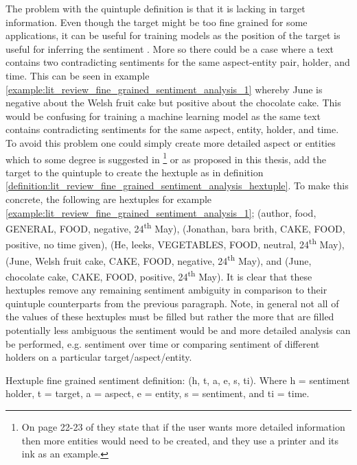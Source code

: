 The problem with the quintuple definition is that it is lacking in target information. Even though the target might be too fine grained for some applications, it can be useful for training models as the position of the target is useful for inferring the sentiment \citep{gu-etal-2018-position}. More so there could be a case where a text contains two contradicting sentiments for the same aspect-entity pair, holder, and time. This can be seen in example \ref{example:lit_review_fine_grained_sentiment_analysis_1} whereby June is negative about the Welsh fruit cake but positive about the chocolate cake. This would be confusing for training a machine learning model as the same text contains contradicting sentiments for the same aspect, entity, holder, and time. To avoid this problem one could simply create more detailed aspect or entities which to some degree is suggested in \citet{liu2015sentiment}\footnote{On page 22-23 of \citet{liu2015sentiment} they state that if the user wants more detailed information then more entities would need to be created, and they use a printer and its ink as an example.} or as proposed in this thesis, add the target to the quintuple to create the hextuple as in definition \ref{definition:lit_review_fine_grained_sentiment_analysis_hextuple}. To make this concrete, the following are hextuples for example \ref{example:lit_review_fine_grained_sentiment_analysis_1}; (author, food, GENERAL, FOOD, negative, 24\textsuperscript{th} May), (Jonathan, bara brith, CAKE, FOOD, positive, no time given), (He, leeks, VEGETABLES, FOOD, neutral, 24\textsuperscript{th} May), (June, Welsh fruit cake, CAKE, FOOD, negative, 24\textsuperscript{th} May), and (June, chocolate cake, CAKE, FOOD, positive, 24\textsuperscript{th} May). It is clear that these hextuples remove any remaining sentiment ambiguity in comparison to their quintuple counterparts from the previous paragraph. Note, in general not all of the values of these hextuples must be filled but rather the more that are filled potentially less ambiguous the sentiment would be and more detailed analysis can be performed, e.g. sentiment over time or comparing sentiment of different holders on a particular target/aspect/entity.

\begin{definition}
Hextuple fine grained sentiment definition: (h, t, a, e, s, ti). Where h = sentiment holder, t = target, a = aspect, e = entity, s = sentiment, and ti = time.
\label{definition:lit_review_fine_grained_sentiment_analysis_hextuple}
\end{definition}

